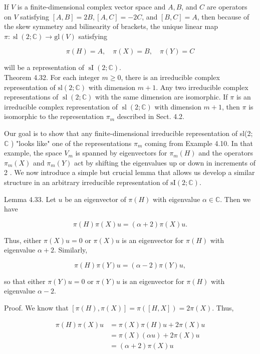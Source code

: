 \documentclass[10pt, letterpaper]{article}
\begin{document}
If $V$ is a finite-dimensional complex vector space and $A, B$, and $C$ are operators on $V$ satisfying $[A, B]=2 B,[A, C]=-2 C$, and $[B, C]=A$, then because of the skew symmetry and bilinearity of brackets, the unique linear map $\pi: \operatorname{sl}(2 ; \mathbb{C}) \rightarrow \mathrm{gl}(V)$ satisfying

$$
\pi(H)=A, \quad \pi(X)=B, \quad \pi(Y)=C
$$

will be a representation of $\operatorname{sI}(2 ; \mathbb{C})$.\\
Theorem 4.32. For each integer $m \geq 0$, there is an irreducible complex representation of $\mathrm{sl}(2 ; \mathbb{C})$ with dimension $m+1$. Any two irreducible complex representations of $\operatorname{sl}(2 ; \mathbb{C})$ with the same dimension are isomorphic. If $\pi$ is an irreducible complex representation of $\operatorname{sl}(2 ; \mathbb{C})$ with dimension $m+1$, then $\pi$ is isomorphic to the representation $\pi_{m}$ described in Sect. 4.2.

Our goal is to show that any finite-dimensional irreducible representation of sl(2; $\mathbb{C}$ ) "looks like" one of the representations $\pi_{m}$ coming from Example 4.10. In that example, the space $V_{m}$ is spanned by eigenvectors for $\pi_{m}(H)$ and the operators $\pi_{m}(X)$ and $\pi_{m}(Y)$ act by shifting the eigenvalues up or down in increments of 2 . We now introduce a simple but crucial lemma that allows us develop a similar structure in an arbitrary irreducible representation of $\mathrm{sI}(2 ; \mathbb{C})$.

Lemma 4.33. Let $u$ be an eigenvector of $\pi(H)$ with eigenvalue $\alpha \in \mathbb{C}$. Then we have

$$
\pi(H) \pi(X) u=(\alpha+2) \pi(X) u .
$$

Thus, either $\pi(X) u=0$ or $\pi(X) u$ is an eigenvector for $\pi(H)$ with eigenvalue $\alpha+2$. Similarly,

$$
\pi(H) \pi(Y) u=(\alpha-2) \pi(Y) u,
$$

so that either $\pi(Y) u=0$ or $\pi(Y) u$ is an eigenvector for $\pi(H)$ with eigenvalue $\alpha-2$.

Proof. We know that $[\pi(H), \pi(X)]=\pi([H, X])=2 \pi(X)$. Thus,

$$
\begin{aligned}
\pi(H) \pi(X) u & =\pi(X) \pi(H) u+2 \pi(X) u \\
& =\pi(X)(\alpha u)+2 \pi(X) u \\
& =(\alpha+2) \pi(X) u
\end{aligned}
$$
\end{document}
